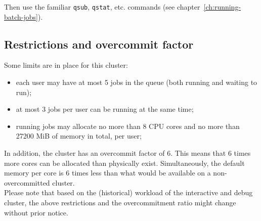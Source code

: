 \begin{prompt}
\end{prompt}

Then use the familiar \lstinline|qsub|, \lstinline|qstat|, etc. commands (see chapter~\ref{ch:running-batch-jobs}).

\subsection{Restrictions and overcommit factor}
\label{subsec:interactive_ugent_restrictions}

Some limits are in place for this cluster:
\begin{itemize}
  \item each user may have at most 5 jobs in the queue (both running and waiting to run);
  \item at most 3 jobs per user can be running at the same time;
  \item running jobs may allocate no more than 8 CPU cores and no more than 27200 MiB of memory in total, per user;
\end{itemize}

In addition, the cluster has an overcommit factor of 6. This means that 6 times more cores
can be allocated than physically exist. Simultaneously, the default memory per core is 6
times less than what would be available on a non-overcommitted cluster.
 \\
Please note that based on the (historical) workload of the interactive and debug cluster, the above
restrictions and the overcommitment ratio might change without prior notice.
